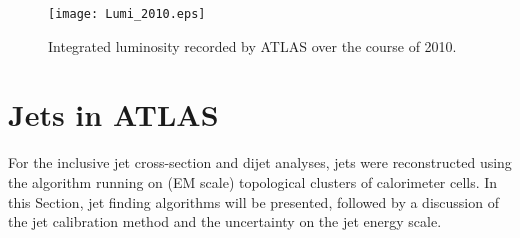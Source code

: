 %
%
%
%




\begin{figure}[tbp]
\begin{center}
\texttt{[image: Lumi\_2010.eps]}
\end{center}
\caption[Integrated luminosity at ATLAS in 2010]{Integrated luminosity recorded by ATLAS over the course of 2010. }
\label{luminosity_fig}
\end{figure}

\section{Jets in ATLAS}
\label{sec::jetsinatlas}
For the inclusive jet cross-section and dijet analyses, jets were reconstructed using the \akt algorithm running on (EM scale) topological clusters of calorimeter cells. In this Section, jet finding algorithms will be presented, followed by a discussion of the jet calibration method and the uncertainty on the jet energy scale.

